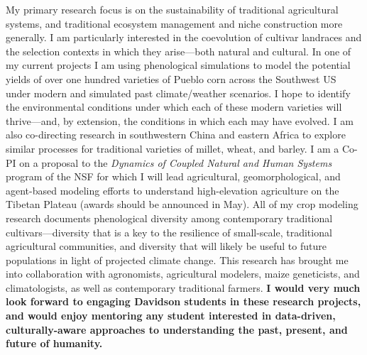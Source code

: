 \documentclass[letterpaper,11pt]{letter}
\begin{document}
\begin{letter}{}
My primary research focus is on the sustainability of traditional agricultural systems, and traditional ecosystem management and niche construction more generally. I am particularly interested in the coevolution of cultivar landraces and the selection contexts in which they arise---both natural and cultural. In one of my current projects I am using phenological simulations to model the potential yields of over one hundred varieties of Pueblo corn across the Southwest US under modern and simulated past climate/weather scenarios. I hope to identify the environmental conditions under which each of these modern varieties will thrive---and, by extension, the conditions in which each may have evolved. I am also co-directing research in southwestern China and eastern Africa to explore similar processes for traditional varieties of millet, wheat, and barley\cite{DAlpoimGuedes2015, DAlpoimGuedes2015_PLoSONE, DAlpoimGuedes2016_CA}. I am a Co-PI on a proposal to the \emph{Dynamics of Coupled Natural and Human Systems} program of the NSF for which I will lead agricultural, geomorphological, and agent-based modeling efforts to understand high-elevation agriculture on the Tibetan Plateau (awards should be announced in May). All of my crop modeling research documents phenological diversity among contemporary traditional cultivars---diversity that is a key to the resilience of small-scale, traditional agricultural communities, and diversity that will likely be useful to future populations in light of projected climate change. This research has brought me into collaboration with agronomists, agricultural modelers, maize geneticists, and climatologists, as well as contemporary traditional farmers. {\bf I would very much look forward to engaging Davidson students in these research projects, and would enjoy mentoring any student interested in data-driven, culturally-aware approaches to understanding the past, present, and future of humanity.}


\end{letter}
\end{document}
